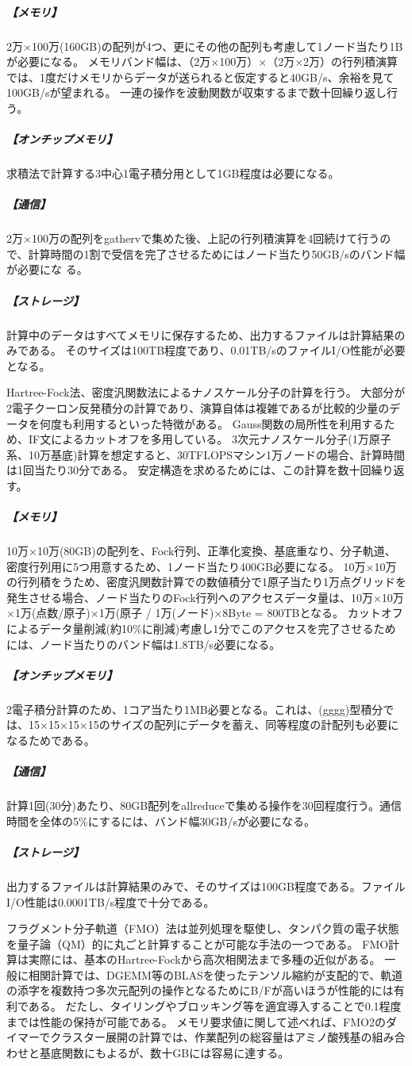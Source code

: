 \subparagraph{【メモリ】}
2万×100万(160GB)の配列が4つ、更にその他の配列も考慮して1ノード当たり1Bが必要になる。
メモリバンド幅は、（2万×100万）×（2万×2万）の行列積演算では、1度だけメモリからデータが送られると仮定すると40GB/s、余裕を見て100GB/sが望まれる。
一連の操作を波動関数が収束するまで数十回繰り返し行う。

\subparagraph{【オンチップメモリ】}
求積法で計算する3中心1電子積分用として1GB程度は必要になる。

\subparagraph{【通信】}
2万×100万の配列をgathervで集めた後、上記の行列積演算を4回続けて行うので、計算時間の1割で受信を完了させるためにはノード当たり50GB/sのバンド幅が必要にな
る。

\subparagraph{【ストレージ】}
計算中のデータはすべてメモリに保存するため、出力するファイルは計算結果のみである。
そのサイズは100TB程度であり、0.01TB/sのファイルI/O性能が必要となる。

Hartree-Fock法、密度汎関数法によるナノスケール分子の計算を行う。
大部分が2電子クーロン反発積分の計算であり、演算自体は複雑であるが比較的少量のデータを何度も利用するといった特徴がある。
Gauss関数の局所性を利用するため、IF文によるカットオフを多用している。
3次元ナノスケール分子(1万原子系、10万基底)計算を想定すると、30TFLOPSマシン1万ノードの場合、計算時間は1回当たり30分である。
安定構造を求めるためには、この計算を数十回繰り返す。

\subparagraph{【メモリ】}
10万×10万(80GB)の配列を、Fock行列、正準化変換、基底重なり、分子軌道、密度行列用に5つ用意するため、1ノード当たり400GB必要になる。
10万×10万の行列積をうため、密度汎関数計算での数値積分で1原子当たり1万点グリッドを発生させる場合、ノード当たりのFock行列へのアクセスデータ量は、10万×10万×1万(点数/原子)×1万(原子 / 1万(ノード)×8Byte = 800TBとなる。
カットオフによるデータ量削減(約10\%に削減)考慮し1分でこのアクセスを完了させるためには、ノード当たりのバンド幅は1.8TB/s必要になる。

\subparagraph{【オンチップメモリ】}
2電子積分計算のため、1コア当たり1MB必要となる。これは、(gg{\textbar}gg)型積分では、15×15×15×15のサイズの配列にデータを蓄え、同等程度の計配列も必要になるためである。

\subparagraph{【通信】}
計算1回(30分)あたり、80GB配列をallreduceで集める操作を30回程度行う。通信時間を全体の5\%にするには、バンド幅30GB/sが必要になる。

\subparagraph{【ストレージ】}
出力するファイルは計算結果のみで、そのサイズは100GB程度である。ファイルI/O性能は0.0001TB/s程度で十分である。

フラグメント分子軌道（FMO）法は並列処理を駆使し、タンパク質の電子状態を量子論（QM）的に丸ごと計算することが可能な手法の一つである。
FMO計算は実際には、基本のHartree-Fockから高次相関法まで多種の近似がある。
一般に相関計算では、DGEMM等のBLASを使ったテンソル縮約が支配的で、軌道の添字を複数持つ多次元配列の操作となるためにB/Fが高いほうが性能的には有利である。
だたし、タイリングやブロッキング等を適宜導入することで0.1程度までは性能の保持が可能である。
メモリ要求値に関して述べれば、FMO2のダイマーでクラスター展開の計算では、作業配列の総容量はアミノ酸残基の組み合わせと基底関数にもよるが、数十GBには容易に達する。

